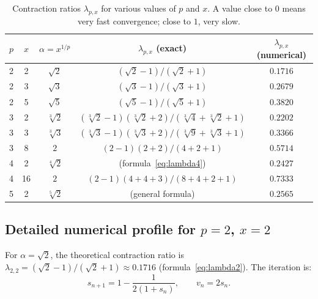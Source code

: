\documentclass[11pt,a4paper]{article}
\theoremstyle{definition}
\newcommand{\cbrt}[1]{\sqrt[3]{#1}}
\begin{document}
\begin{table}[h]
\centering
\begin{tabular}{ccccc}
\toprule
$p$ & $x$ & $\alpha = x^{1/p}$ & $\lambda_{p,x}$ (exact) & $\lambda_{p,x}$ (numerical) \\
\midrule
2 & 2 & $\sqrt{2}$ & $(\sqrt{2}-1)/(\sqrt{2}+1)$ & $0.1716$ \\
2 & 3 & $\sqrt{3}$ & $(\sqrt{3}-1)/(\sqrt{3}+1)$ & $0.2679$ \\
2 & 5 & $\sqrt{5}$ & $(\sqrt{5}-1)/(\sqrt{5}+1)$ & $0.3820$ \\
\midrule
3 & 2 & $\cbrt{2}$ & $(\cbrt{2}-1)(\cbrt{2}+2)/(\cbrt{4}+\cbrt{2}+1)$ & $0.2202$ \\
3 & 3 & $\cbrt{3}$ & $(\cbrt{3}-1)(\cbrt{3}+2)/(\cbrt{9}+\cbrt{3}+1)$ & $0.3366$ \\
3 & 8 & $2$ & $(2-1)(2+2)/(4+2+1)$ & $0.5714$ \\
\midrule
4 & 2 & $\sqrt[4]{2}$ & (formula~\eqref{eq:lambda4}) & $0.2427$ \\
4 & 16 & $2$ & $(2-1)(4+4+3)/(8+4+2+1)$ & $0.7333$ \\
\midrule
5 & 2 & $\sqrt[5]{2}$ & (general formula) & $0.2565$ \\
\bottomrule
\end{tabular}
\caption{Contraction ratios $\lambda_{p,x}$ for various values of $p$ and $x$. A value close to $0$ means very fast convergence; close to $1$, very slow.}
\end{table}

\subsection{Detailed numerical profile for \texorpdfstring{$p=2$, $x=2$}{p=2, x=2}}

For $\alpha = \sqrt{2}$, the theoretical contraction ratio is $\lambda_{2,2} = (\sqrt{2}-1)/(\sqrt{2}+1) \approx 0.1716$ (formula~\eqref{eq:lambda2}). The iteration is:
\[
  s_{n+1} = 1 - \frac{1}{2(1 + s_n)}, \qquad v_n = 2s_n.
\]
\end{document}
